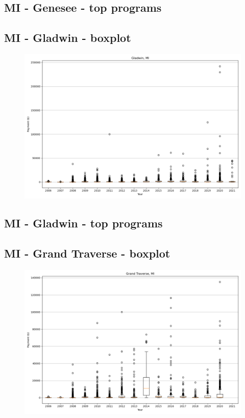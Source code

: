 \subsection*{MI - Genesee - top programs}

\newpage
\subsection*{MI - Gladwin - boxplot}
\begin{figure}[h]
\centering
\includegraphics[width=7in]{../output/boxplots/counties/Gladwin-MI_boxplot.png}
\end{figure}


\subsection*{MI - Gladwin - top programs}

\newpage
\subsection*{MI - Grand Traverse - boxplot}
\begin{figure}[h]
\centering
\includegraphics[width=7in]{../output/boxplots/counties/Grand Traverse-MI_boxplot.png}
\end{figure}


